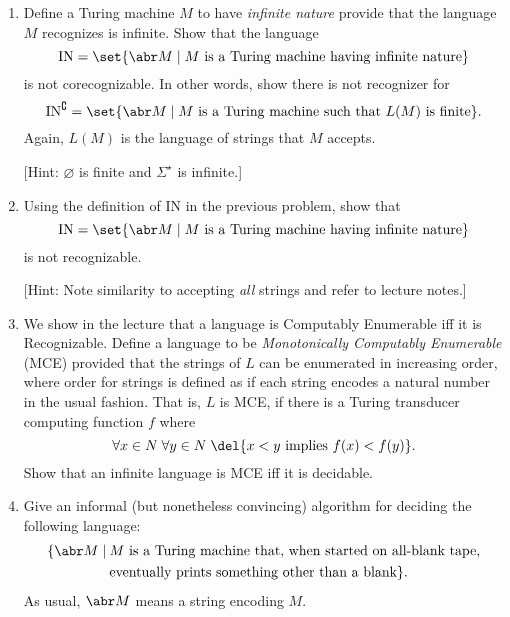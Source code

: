 \documentclass{cs81-homework}
\begin{document}
\begin{enumerate}
\item {} Define a Turing machine \(M\) to have \emph{infinite nature}
  provide that the language \(M\) recognizes is infinite.  Show that the
  language
  \[
    \mathrm{IN} = \set{\abr M \mid \text{\(M\) is a Turing machine having
        infinite nature}}
  \]
  is not corecognizable.  In other words, show there is not recognizer for
  \[
    \mathrm{IN}^\complement = \set{\abr M \mid \text{\(M\) is a Turing machine
        such that \(L(M)\) is finite}}.
  \]
  Again, \(L(M)\) is the language of strings that \(M\) accepts.

  [Hint: \(\varnothing\) is finite and \(\Sigma^\star\) is infinite.]

  \begin{solution}
  \end{solution}

\item {} Using the definition of \(\mathrm{IN}\) in the previous
  problem, show that
  \[
    \mathrm{IN} = \set{\abr M \mid \text{\(M\) is a Turing machine having
        infinite nature}}
  \]
  is not recognizable.

  [Hint: Note similarity to accepting \emph{all} strings and refer to lecture
  notes.]

  \begin{solution}
  \end{solution}

\item {} We show in the lecture that a language is Computably
  Enumerable iff it is Recognizable.  Define a language to be
  \emph{Monotonically Computably Enumerable} (MCE) provided that the strings of
  \(L\) can be enumerated in increasing order, where order for strings is
  defined as if each string encodes a natural number in the usual fashion.  That
  is, \(L\) is MCE, if there is a Turing transducer computing function \(f\)
  where
  \[
    \forall x \in N \; \forall y \in N \; \del{\text{\(x<y\) implies
        \(f(x) < f(y)\)}}.
  \]
  Show that an infinite language is MCE iff it is decidable.
  
  \begin{solution}
  \end{solution}

\item {} Give an informal (but nonetheless convincing) algorithm for
  deciding the following language:
  \begin{align*}
    \{\abr M \mid\: &\text{\(M\) is a Turing machine that, when started on
                      all-blank tape,} \\
                    & \text{eventually prints something other than a blank}\}.
  \end{align*}
  As usual, \(\abr M\) means a string encoding \(M\). 

  \begin{solution}
  \end{solution}

\end{enumerate}
    
\end{document}
